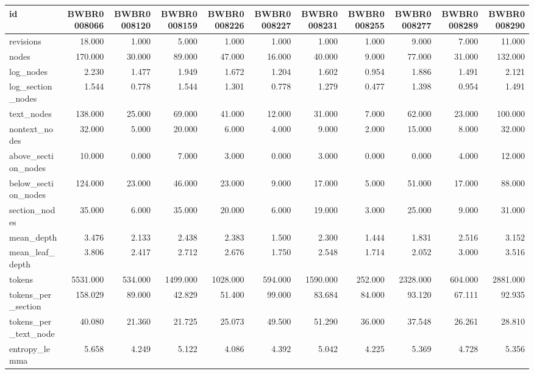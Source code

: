 \begin{tabular}{lrrrrrrrrrr}
\toprule
id & BWBR0008066 & BWBR0008120 & BWBR0008159 & BWBR0008226 & BWBR0008227 & BWBR0008231 & BWBR0008255 & BWBR0008277 & BWBR0008289 & BWBR0008290 \\
\midrule
revisions & 18.000 & 1.000 & 5.000 & 1.000 & 1.000 & 1.000 & 1.000 & 9.000 & 7.000 & 11.000 \\
\cline{1-11}
nodes & 170.000 & 30.000 & 89.000 & 47.000 & 16.000 & 40.000 & 9.000 & 77.000 & 31.000 & 132.000 \\
\cline{1-11}
log\_nodes & 2.230 & 1.477 & 1.949 & 1.672 & 1.204 & 1.602 & 0.954 & 1.886 & 1.491 & 2.121 \\
\cline{1-11}
log\_section\_nodes & 1.544 & 0.778 & 1.544 & 1.301 & 0.778 & 1.279 & 0.477 & 1.398 & 0.954 & 1.491 \\
\cline{1-11}
text\_nodes & 138.000 & 25.000 & 69.000 & 41.000 & 12.000 & 31.000 & 7.000 & 62.000 & 23.000 & 100.000 \\
\cline{1-11}
nontext\_nodes & 32.000 & 5.000 & 20.000 & 6.000 & 4.000 & 9.000 & 2.000 & 15.000 & 8.000 & 32.000 \\
\cline{1-11}
above\_section\_nodes & 10.000 & 0.000 & 7.000 & 3.000 & 0.000 & 3.000 & 0.000 & 0.000 & 4.000 & 12.000 \\
\cline{1-11}
below\_section\_nodes & 124.000 & 23.000 & 46.000 & 23.000 & 9.000 & 17.000 & 5.000 & 51.000 & 17.000 & 88.000 \\
\cline{1-11}
section\_nodes & 35.000 & 6.000 & 35.000 & 20.000 & 6.000 & 19.000 & 3.000 & 25.000 & 9.000 & 31.000 \\
\cline{1-11}
mean\_depth & 3.476 & 2.133 & 2.438 & 2.383 & 1.500 & 2.300 & 1.444 & 1.831 & 2.516 & 3.152 \\
\cline{1-11}
mean\_leaf\_depth & 3.806 & 2.417 & 2.712 & 2.676 & 1.750 & 2.548 & 1.714 & 2.052 & 3.000 & 3.516 \\
\cline{1-11}
tokens & 5531.000 & 534.000 & 1499.000 & 1028.000 & 594.000 & 1590.000 & 252.000 & 2328.000 & 604.000 & 2881.000 \\
\cline{1-11}
tokens\_per\_section & 158.029 & 89.000 & 42.829 & 51.400 & 99.000 & 83.684 & 84.000 & 93.120 & 67.111 & 92.935 \\
\cline{1-11}
tokens\_per\_text\_node & 40.080 & 21.360 & 21.725 & 25.073 & 49.500 & 51.290 & 36.000 & 37.548 & 26.261 & 28.810 \\
\cline{1-11}
entropy\_lemma & 5.658 & 4.249 & 5.122 & 4.086 & 4.392 & 5.042 & 4.225 & 5.369 & 4.728 & 5.356 \\

\end{tabular}
